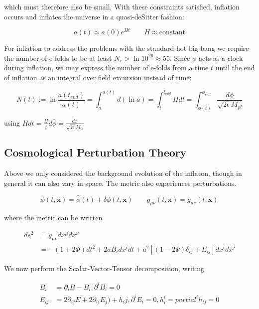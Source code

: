 \documentclass[a4paper,10pt]{article}
\renewcommand{\v}[1]{\mathbf{#1}}
\newcommand{\Mp}{M_{pl}}
\newcommand{\bphi}{\bar{\phi}}
\begin{document}
which must therefore also be small. With these constraints satisfied, inflation occurs and inflates the universe in a quasi-deSitter fashion:

\begin{equation}
a(t) \approx a(0)e^{Ht} \qquad H\approx\text{constant}
\end{equation} 
 
For inflation to address the problems with the standard hot big bang we require the number of e-folds to be at least $N_e > \ln{10^{26}} \approx 55$. Since $\phi$ acts as a clock during inflation, we may express the number of e-folds from a time $t$ until the end of inflation as an integral over field excursion instead of time:

\begin{equation}
N(t) := \ln{\frac{a(t_{end})}{a(t)}} = \int_a^{a(t)} d(\ln{a}) = \int_t^{t_{end}} Hdt = \int_{\phi(t)}^{\phi_{end}} \frac{d\phi}{\sqrt{2\epsilon}\Mp}
\label{efolds}
\end{equation}

using $Hdt=\frac{H}{\dot{\phi}}d\bphi=\frac{d\phi}{\sqrt{2\epsilon}\Mp}$


\subsection{Cosmological Perturbation Theory}

Above we only considered the background evolution of the inflaton, though in general it can also vary in space. The metric also experiences perturbations.

\begin{equation}
\phi(t,\v{x}) = \bphi(t) +\delta\phi(t,\v{x}) \qquad g_{\mu\nu}(t,\v{x}) = \bar{g}_{\mu\nu}(t,\v{x})
\end{equation}

where the metric can be written

\begin{equation}
\begin{split}
ds^2 &= g_{\mu\nu}dx^\mu dx^\nu\\
&= -(1+2\Phi)dt^2 + 2aB_idx^idt+a^2[(1-2\Psi)\delta_{ij}+E_{ij}]dx^idx^j
\end{split}
\end{equation}

We now perform the Scalar-Vector-Tensor decomposition, writing

\begin{align}
B_i &= \partial_i B - B_i, \partial^iB_i=0\\
E_{ij} &= 2\partial_{ij}E + 2\partial_{(i}E_{j}) + h_ij, \partial^iE_i=0, h^i_i = partial^ih_{ij}=0
\end{align}
\end{document}

